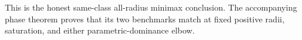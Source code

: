 This is the honest same-class all-radius minimax conclusion.  The accompanying phase theorem proves that its two benchmarks match at fixed positive radii, saturation, and either parametric-dominance elbow.
